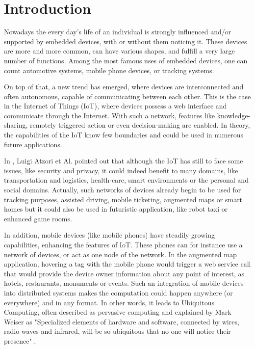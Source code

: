 \chapter{Introduction}
\label{cha:introduction}

Nowadays the every day's life of an individual is strongly influenced and/or supported by embedded devices, with or without them noticing it. These devices are more and more common, can have various shapes, and fulfill a very large number of functions. Among the most famous uses of embedded devices,  one can count automotive systems, mobile phone devices, or tracking systems.

On top of that, a new trend has emerged, where devices are interconnected and often autonomous, capable of communicating between each other. This is the case in the Internet of Things (IoT), where devices possess a web interface and communicate through the Internet. With such a network, features like knowledge-sharing, remotely triggered action or even decision-making are enabled. In theory, the capabilities of the IoT know few boundaries and could be used in numerous future applications. 

In  \cite{Atzori2010}, Luigi Atzori et Al. pointed out that although the IoT has still to face some issues, like security and privacy, it could indeed benefit to many domains, like transportation and logistics, health-care, smart environments or the personal and social domains. Actually, such networks of devices already begin to be used for tracking purposes, assisted driving, mobile ticketing, augmented maps or smart homes but it could also be used in futuristic application, like robot taxi or enhanced game rooms.

In addition, mobile devices (like mobile phones) have steadily growing capabilities, enhancing the features of IoT. These phones can for instance use a network of devices, or act as one node of the network. In the augmented map application, hovering a tag with the mobile phone would trigger a web service call that would provide the device owner information about any point of interest, as hotels, restaurants, monuments or events. Such an integration of mobile devices into distributed systems makes the computation could happen anywhere (or everywhere) and in any format. In other words, it leads to Ubiquitous Computing, often described as pervasive computing and explained by Mark Weiser as "Specialized elements of hardware and software, connected by wires, radio waves and infrared, will be so ubiquitous that no one will notice their presence" \cite{Computer_21Century}.

